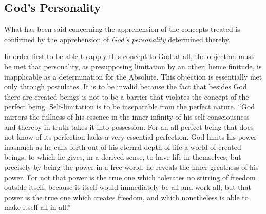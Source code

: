 \documentclass[12pt,a4paper]{book}
\begin{document}
\subsection{God's Personality}
\label{ssec:gods-personality}

What has been said concerning the apprehension of the concepts treated is confirmed
by the apprehension of \emph{God's personality} determined thereby.

In order first to be able to apply this concept to God at all, the objection must be
met that personality, as presupposing limitation by an other, hence finitude, is
inapplicable as a determination for the Absolute. This objection is essentially met
only through postulates. It is to be invalid because the fact that besides God there
are created beings is not to be a barrier that violates the concept of the perfect
being. Self-limitation is to be inseparable from the perfect nature. ``God mirrors
the fullness of his essence in the inner infinity of his self-consciousness and
thereby in truth takes it into possession. For an all-perfect being that does not
know of its perfection lacks a very essential perfection. God limits his power
inasmuch as he calls forth out of his eternal depth of life a world of created
beings, to which he gives, in a derived sense, to have life in themselves; but
precisely by being the power in a free world, he reveals the inner greatness of his
power. For not that power is the true one which tolerates no stirring of freedom
outside itself, because it itself would immediately be all and work all; but that
power is the true one which creates freedom, and which nonetheless is able to make
itself all in all.''
\end{document}
